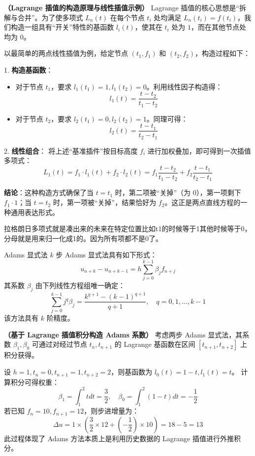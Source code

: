 \begin{example}
    \textbf{（Lagrange 插值的构造原理与线性插值示例）} 
    Lagrange 插值的核心思想是“拆解与合并”。为了使多项式 $L_n(t)$ 在每个节点 $t_i$ 处均满足 $L_n(t_i) = f(t_i)$，我们构造一组具有“开关”特性的基函数 $l_i(t)$，使其在 $t_i$ 处为 $1$，而在其他节点处均为 $0$。
    
    以最简单的两点线性插值为例，给定节点 $(t_1, f_1)$ 和 $(t_2, f_2)$，构造过程如下：
    
    1. \textbf{构造基函数}：
    \begin{itemize}
        \item 对于节点 $t_1$，要求 $l_1(t_1)=1, l_1(t_2)=0$。利用线性因子构造得：
        $$l_1(t) = \frac{t - t_2}{t_1 - t_2}$$
        \item 对于节点 $t_2$，要求 $l_2(t_1)=0, l_2(t_2)=1$。同理可得：
        $$l_2(t) = \frac{t - t_1}{t_2 - t_1}$$
    \end{itemize}
    
    2. \textbf{线性组合}：
    将上述“基准插件”按目标高度 $f_i$ 进行加权叠加，即可得到一次插值多项式：
    $$L_1(t) = f_1 \cdot l_1(t) + f_2 \cdot l_2(t) = f_1 \frac{t - t_2}{t_1 - t_2} + f_2 \frac{t - t_1}{t_2 - t_1}$$
    
    \textbf{结论}：这种构造方式确保了当 $t=t_1$ 时，第二项被“关掉”（为 $0$），第一项剩下 $f_1 \cdot 1$；当 $t=t_2$ 时，第一项被“关掉”，结果恰好为 $f_2$。这正是两点直线方程的一种通用表达形式。
\end{example}
\begin{dxtips}
    拉格朗日多项式就是凑出来的未来在特定位置比如t1的时候等于1其他时候等于0，分母就是用来归一化成1的。因为所有项都不是0了。
\end{dxtips}
\begin{definition}{Adams 显式法}
    $k$ 步 Adams 显式法具有如下形式：
    $$u_{n+k} - u_{n+k-1} = h \sum_{j=0}^{k-1} \beta_j f_{n+j}$$
    其系数 $\beta_j$ 由下列线性方程组唯一确定：
    $$\sum_{j=0}^{k-1} j^q \beta_j = \frac{k^{q+1} - (k-1)^{q+1}}{q+1}, \quad q = 0, 1, \dots, k-1$$
    该方法具有 $k$ 阶精度。
\end{definition}
\begin{example}
    \textbf{（基于 Lagrange 插值积分构造 Adams 系数）} 考虑两步 Adams 显式法，其系数 $\beta_1, \beta_0$ 可通过对经过节点 $t_n, t_{n+1}$ 的 Lagrange 基函数在区间 $[t_{n+1}, t_{n+2}]$ 上积分获得。
    
    设 $h=1, t_n=0, t_{n+1}=1, t_{n+2}=2$，则基函数为 $l_0(t) = 1-t, l_1(t) = t$。
    计算积分可得权重：
    $$\beta_1 = \int_{1}^{2} t dt = \frac{3}{2}, \quad \beta_0 = \int_{1}^{2} (1-t) dt = -\frac{1}{2}$$
    若已知 $f_n=10, f_{n+1}=12$，则步进增量为：
    $$\Delta u = 1 \times \left( \frac{3}{2} \times 12 + (-\frac{1}{2}) \times 10 \right) = 18 - 5 = 13$$
    此过程体现了 Adams 方法本质上是利用历史数据的 Lagrange 插值进行外推积分。
\end{example}
